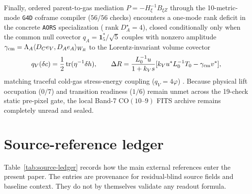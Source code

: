 \documentclass[11pt]{article}
\begin{document}
Finally, ordered parent-to-gas mediation $P=-H_\xi^{-1}B_{\xi Z}$ through the
10-metric-mode \texttt{G4D} coframe compiler ($56/56$ checks) encounters a
one-mode rank deficit in the concrete \texttt{AORS} specialization
($\operatorname{rank}D_A^\star=4$), closed conditionally only when the common
null covector $q_A=\mathbf{1}_5^*/\sqrt{5}$ couples with nonzero amplitude
$\gamma_{\rm cm}=\Lambda_A\langle D_C e_V,D_A e_A\rangle_{W_R}$ to the
Lorentz-invariant volume covector
\[
q_V(\delta c)=\frac{1}{2}\operatorname{tr}(\eta^{-1}\delta h),
\qquad
\Delta R=\frac{L_0^{-1}u}{1+k_V s}[k_V u^*L_0^{-1}T_0-\gamma_{\rm cm}v^*],
\]
matching traceful cold-gas stress-energy coupling ($q_V=4\varphi$)
\cite{Brown1993PerfectFluids}. Because physical lift occupation ($0/7$) and
transition readiness ($1/6$) remain unmet across the 19-check static pre-pixel
gate, the local Band-7 $\mathrm{CO}(10\text{--}9)$ FITS archive remains
completely unread and sealed.

\section{Source-reference ledger}

Table~\ref{tab:source-ledger} records how the main external references enter the
present paper.  The entries are provenance for residual-blind source fields and
baseline context.  They do not by themselves validate any readout formula.
\end{document}
